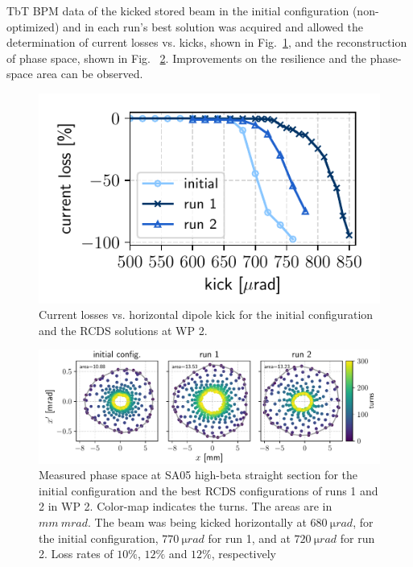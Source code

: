 TbT BPM data of the kicked stored beam  in the initial configuration (non-optimized) and in each run's best solution was acquired and allowed the determination of current losses vs. kicks, shown in Fig.~\ref{fig:loss_kicks_newtunes}, and the reconstruction of phase space, shown in Fig. ~\ref{fig:newtunes_phase}. Improvements on the resilience and the phase-space area can be observed.
\begin{figure}
    \centering
    \includegraphics[width=0.7\columnwidth]{Images/WEPL087_f3.pdf}
    \caption[Current losses vs. horizontal dipole kick for the initial configuration and the RCDS solutions at WP 2.]{Current losses vs. horizontal dipole kick for the initial configuration and the RCDS solutions at WP 2.}
    \label{fig:loss_kicks_newtunes}
\end{figure}
\begin{figure}[tb]
    \includegraphics[width=\textwidth]{Images/WEPL087_f4.pdf}
    \caption[Measured phase space at SA05 high-beta straight section for the initial configuration and the best RCDS configurations of runs 1 and 2 in WP 2.]{Measured phase space at SA05 high-beta straight section for the initial configuration and the best RCDS configurations of runs 1 and 2 in WP 2. Color-map indicates the turns. The areas are in $\unit{mm}~\unit{mrad}$. The beam was being kicked horizontally at $680~\unit{\micro rad}$, for the initial configuration, $770~\unit{\micro rad}$ for run 1, and at $720~\unit{\micro rad}$ for run 2. Loss rates of $10\%$, $12\%$ and $12\%$, respectively}
    \label{fig:newtunes_phase}
\end{figure}

